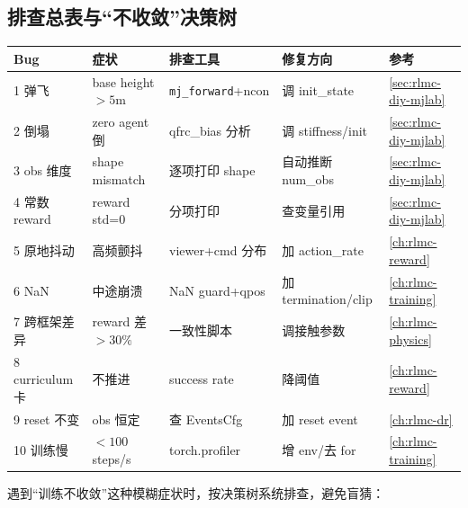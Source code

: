 \subsection{排查总表与“不收敛”决策树}
\label{sec:rlmc-diy-bugs-table}

\begin{center}
\small
\begin{tabular}{@{}lp{3.0cm}p{3.2cm}p{3.0cm}l@{}}
\toprule
Bug & 症状 & 排查工具 & 修复方向 & 参考 \\
\midrule
1 弹飞 & base height $>5$m & \verb|mj_forward|+ncon & 调 init\_state & \cref{sec:rlmc-diy-mjlab} \\
2 倒塌 & zero agent 倒 & qfrc\_bias 分析 & 调 stiffness/init & \cref{sec:rlmc-diy-mjlab} \\
3 obs 维度 & shape mismatch & 逐项打印 shape & 自动推断 num\_obs & \cref{sec:rlmc-diy-mjlab} \\
4 常数 reward & reward std=0 & 分项打印 & 查变量引用 & \cref{sec:rlmc-diy-mjlab} \\
5 原地抖动 & 高频颤抖 & viewer+cmd 分布 & 加 action\_rate & \cref{ch:rlmc-reward} \\
6 NaN & 中途崩溃 & NaN guard+qpos & 加 termination/clip & \cref{ch:rlmc-training} \\
7 跨框架差异 & reward 差 $>30\%$ & 一致性脚本 & 调接触参数 & \cref{ch:rlmc-physics} \\
8 curriculum 卡 & 不推进 & success rate & 降阈值 & \cref{ch:rlmc-reward} \\
9 reset 不变 & obs 恒定 & 查 EventsCfg & 加 reset event & \cref{ch:rlmc-dr} \\
10 训练慢 & $<100$ steps/s & torch.profiler & 增 env/去 for & \cref{ch:rlmc-training} \\
\bottomrule
\end{tabular}
\end{center}

遇到“训练不收敛”这种模糊症状时，按决策树系统排查，避免盲猜：

